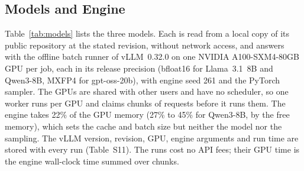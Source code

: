 \subsection{Models and Engine}
\label{sec:methods:models}

Table~\ref{tab:models} lists the three models. Each is read from a local copy of its public repository at the stated revision, without network access, and answers with the offline batch runner of vLLM~0.32.0 \cite{kwon2023vllm} on one NVIDIA A100-SXM4-80GB GPU per job, each in its release precision (bfloat16 for Llama~3.1~8B and Qwen3-8B, MXFP4 for gpt-oss-20b), with engine seed 261 and the PyTorch sampler. The GPUs are shared with other users and have no scheduler, so one worker runs per GPU and claims chunks of requests before it runs them. The engine takes 22\% of the GPU memory (27\% to 45\% for Qwen3-8B, by the free memory), which sets the cache and batch size but neither the model nor the sampling. The vLLM version, revision, GPU, engine arguments and run time are stored with every run (Table~S11). The runs cost no API fees; their GPU time is the engine wall-clock time summed over chunks.

